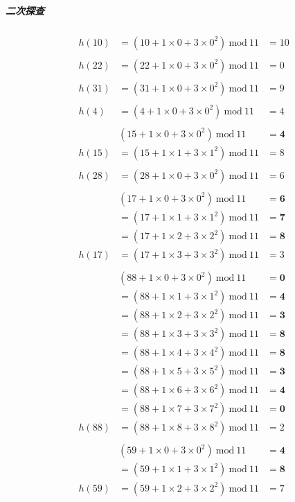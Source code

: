 \documentclass{article}
\begin{document}
\subparagraph{二次探查}
\begin{align*}
    &h(10) &= (10 + 1 \times 0 + 3 \times 0^2 ) \ \text{mod}\  11 &= 10 \\
    \\
    &h(22) &= (22 + 1 \times 0 + 3 \times 0^2 ) \ \text{mod}\  11 &= 0 \\
    \\
    &h(31) &= (31 + 1 \times 0 + 3 \times 0^2 ) \ \text{mod}\  11 &= 9 \\
    \\
    &h(4) &= (4 + 1 \times 0 + 3 \times 0^2 ) \ \text{mod}\  11 &= 4 \\
    \\
    && (15 + 1 \times 0 + 3 \times 0^2 ) \ \text{mod}\  11 &= \mathbf{4} \\
    &h(15) &= (15 + 1 \times 1 + 3 \times 1^2 ) \ \text{mod}\  11 &= 8 \\
    \\
    &h(28) &= (28 + 1 \times 0 + 3 \times 0^2 ) \ \text{mod}\  11 &= 6 \\
    \\
    &&(17 + 1 \times 0 + 3 \times 0^2 ) \ \text{mod}\  11 &= \mathbf{6} \\
    &&= (17 + 1 \times 1 + 3 \times 1^2 ) \ \text{mod}\  11 &= \mathbf{7} \\
    &&= (17 + 1 \times 2 + 3 \times 2^2 ) \ \text{mod}\  11 &= \mathbf{8} \\
    &h(17) &= (17 + 1 \times 3 + 3 \times 3^2 ) \ \text{mod}\  11 &= 3 \\
    \\
    &&(88 + 1 \times 0 + 3 \times 0^2 ) \ \text{mod}\  11 &= \mathbf{0} \\
    &&= (88 + 1 \times 1 + 3 \times 1^2 ) \ \text{mod}\  11 &= \mathbf{4} \\
    &&= (88 + 1 \times 2 + 3 \times 2^2 ) \ \text{mod}\  11 &= \mathbf{3} \\
    &&= (88 + 1 \times 3 + 3 \times 3^2 ) \ \text{mod}\  11 &= \mathbf{8} \\
    &&= (88 + 1 \times 4 + 3 \times 4^2 ) \ \text{mod}\  11 &= \mathbf{8} \\
    &&= (88 + 1 \times 5 + 3 \times 5^2 ) \ \text{mod}\  11 &= \mathbf{3} \\
    &&= (88 + 1 \times 6 + 3 \times 6^2 ) \ \text{mod}\  11 &= \mathbf{4} \\
    &&= (88 + 1 \times 7 + 3 \times 7^2 ) \ \text{mod}\  11 &= \mathbf{0} \\
    &h(88) &= (88 + 1 \times 8 + 3 \times 8^2 ) \ \text{mod}\  11 &= 2 \\
    \\
    &&(59 + 1 \times 0 + 3 \times 0^2 ) \ \text{mod}\  11 &= \mathbf{4} \\
    &&= (59 + 1 \times 1 + 3 \times 1^2 ) \ \text{mod}\  11 &= \mathbf{8} \\
    &h(59) &= (59 + 1 \times 2 + 3 \times 2^2 ) \ \text{mod}\  11 &= 7
\end{align*}
\end{document}
